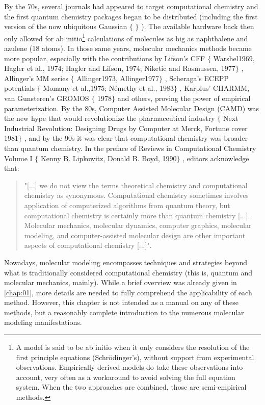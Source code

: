 By the 70s, several journals had appeared to target computational chemistry and the first quantum chemistry packages began to be distributed (including the first version of the now ubiquitous Gaussian $ \{ $ $ \} $ ). The available hardware back then only allowed for ab initio\footnote{ A model is said to be ab initio when it only considers the resolution of the first principle equations (Schrödinger’s), without support from experimental observations. Empirically derived models do take these observations into account, very often as a workaround to avoid solving the full equation system. When the two approaches are combined, those are semi-empirical methods.  } calculations of molecules as big as naphthalene and azulene (18 atoms). In those same years, molecular mechanics methods became more popular, especially with the contributions by Lifson’s CFF $ \{ $ Warshel1969, Hagler et al., 1974; Hagler and Lifson, 1974; Niketic and Rasmussen, 1977$ \} $ , Allinger’s MM series $ \{ $ Allinger1973, Allinger1977$ \} $ , Scheraga’s ECEPP potentials $ \{ $ Momany et al.,1975; Némethy et al., 1983$ \} $ , Karplus’ CHARMM,\cite{brooks1983} van Gunsteren’s GROMOS $ \{ $ 1978$ \} $  and others, proving the power of empirical parameterization. By the 80s, Computer Assisted Molecular Design (CAMD) was the new hype that would revolutionize the pharmaceutical industry $ \{ $ Next Industrial Revolution: Designing Drugs by Computer at Merck, Fortune cover 1981$ \} $ , and by the 90s it was clear that computational chemistry was broader than quantum chemistry. In the preface of Reviews in Computational Chemistry Volume I $ \{ $ Kenny B. Lipkowitz, Donald B. Boyd, 1990$ \} $ , editors acknowledge that:

\begin{quote}
	"[...] we do not view the terms theoretical chemistry and computational chemistry as synonymous. Computational chemistry sometimes involves application of computerized algorithms from quantum theory, but computational chemistry is certainly more than quantum chemistry [...]. Molecular mechanics, molecular dynamics, computer graphics, molecular modeling, and computer-assisted molecular design are other important aspects of computational chemistry [...]".
\end{quote}

Nowadays, molecular modeling encompasses techniques and strategies beyond what is traditionally considered computational chemistry (this is, quantum and molecular mechanics, mainly). While a brief overview was already given in \autoref{chap:01}, more details are needed to fully comprehend the applicability of each method. However, this chapter is not intended as a manual on any of these methods, but a reasonably complete introduction to the numerous molecular modeling manifestations.

